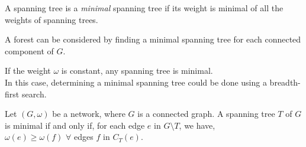 \documentclass[../main.tex]{subfiles}
\begin{document}
\begin{defn}
A spanning tree is a \textit{minimal} spanning tree if its weight is minimal of all the weights of spanning trees.

\noindent A forest can be considered by finding a minimal spanning tree for each connected component of $G.$
\end{defn}

\begin{rem}
If the weight $\omega$ is constant, any spanning tree is minimal.\\
\noindent In this case, determining a minimal spanning tree could be done using a breadth-first search.
\end{rem}

\begin{thm}
Let $(G,\omega)$ be a network, where $G$ is a connected graph. A spanning tree $T$ of $G$ is minimal if and only if, for each edge $e$ in $G \setminus T$, we have,\\
\indent\indent\indent $\omega(e) \geq \omega(f)$  $\forall$ edges $f$ in $C_T(e).$
\end{thm}
 
\end{document}
